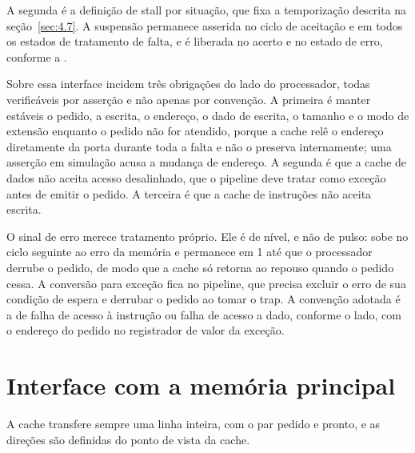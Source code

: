A segunda é a definição de stall por situação, que fixa a temporização descrita na seção~\ref{sec:4.7}. A suspensão permanece asserida no ciclo de aceitação e em todos os estados de tratamento de falta, e é liberada no acerto e no estado de erro, conforme a .

Sobre essa interface incidem três obrigações do lado do processador, todas verificáveis por asserção e não apenas por convenção. A primeira é manter estáveis o pedido, a escrita, o endereço, o dado de escrita, o tamanho e o modo de extensão enquanto o pedido não for atendido, porque a cache relê o endereço diretamente da porta durante toda a falta e não o preserva internamente; uma asserção em simulação acusa a mudança de endereço. A segunda é que a cache de dados não aceita acesso desalinhado, que o pipeline deve tratar como exceção antes de emitir o pedido. A terceira é que a cache de instruções não aceita escrita.

O sinal de erro merece tratamento próprio. Ele é de nível, e não de pulso: sobe no ciclo seguinte ao erro da memória e permanece em 1 até que o processador derrube o pedido, de modo que a cache só retorna ao repouso quando o pedido cessa. A conversão para exceção fica no pipeline, que precisa excluir o erro de sua condição de espera e derrubar o pedido ao tomar o trap. A convenção adotada é a de falha de acesso à instrução ou falha de acesso a dado, conforme o lado, com o endereço do pedido no registrador de valor da exceção.

\section{Interface com a memória principal}\label{sec:4.5}

A cache transfere sempre uma linha inteira, com o par pedido e pronto, e as direções são definidas do ponto de vista da cache.

